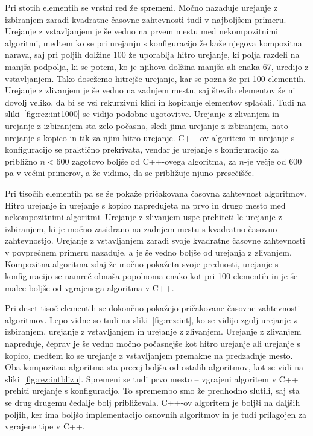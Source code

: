 \documentclass[a4paper,oneside,12pt]{article}
\begin{document}
Pri stotih elementih se vrstni red že spremeni. Močno nazaduje urejanje z izbiranjem zaradi 
kvadratne časovne zahtevnosti tudi v najboljšem primeru. Urejanje z vstavljanjem je še vedno 
na prvem mestu med nekompozitnimi algoritmi, medtem ko se pri urejanju s konfiguracijo že kaže njegova
kompozitna narava, saj pri poljih dolžine 100 že uporablja hitro urejanje, ki polja razdeli na 
manjša podpolja, ki se potem, ko je njihova dolžina manjša ali enaka 67, uredijo z vstavljanjem.
Tako dosežemo hitrejše urejanje, kar se pozna že pri 100 elementih. Urejanje z zlivanjem je še 
vedno na zadnjem mestu, saj število elementov še ni dovolj veliko, da bi se vsi rekurzivni klici 
in kopiranje elementov splačali. Tudi na sliki~\ref{fig:rez:int1000} se vidijo
podobne ugotovitve. Urejanje z zlivanjem in urejanje z izbiranjem sta zelo
počasna, 
sledi jima urejanje z izbiranjem, nato urejanje s kopico in tik za
njim hitro urejanje.  \mbox{C++-ov} algoritem in urejanje s konfiguracijo se praktično
prekrivata, vendar je urejanje s konfiguracijo za približno $n < 600$ zagotovo
boljše od \mbox{C++-ovega} algoritma, za $n$-je večje od 600 pa v večini primerov, a že
vidimo, da se približuje njuno presečišče.

Pri tisočih elementih pa se že pokaže pričakovana časovna zahtevnost algoritmov. Hitro urejanje in urejanje
s kopico napredujeta na prvo in drugo mesto med nekompozitnimi algoritmi. Urejanje z zlivanjem uspe 
prehiteti le urejanje z izbiranjem, ki je močno zasidrano na zadnjem mestu s kvadratno časovno 
zahtevnostjo. Urejanje z vstavljanjem zaradi svoje kvadratne časovne zahtevnosti v povprečnem 
primeru nazaduje, a je še vedno boljše od urejanja z zlivanjem.
Kompozitna algoritma zdaj že močno pokažeta svoje prednosti, urejanje s konfiguracijo se namreč 
obnaša popolnoma enako kot pri 100 elementih in je še malce boljše od vgrajenega
algoritma v C++.

Pri deset tisoč elementih se dokončno pokažejo pričakovane časovne zahtevnosti
algoritmov. Lepo vidne so tudi na sliki~\ref{fig:rez:int}, ko se vidijo zgolj
urejanje z izbiranjem, urejanje z vstavljanjem in urejanje z zlivanjem.
Urejanje z zlivanjem napreduje, čeprav je še vedno močno počasnejše kot hitro urejanje ali
urejanje s kopico, medtem ko se urejanje z vstavljanjem premakne na predzadnje 
mesto. Oba kompozitna algoritma sta precej boljša od ostalih algoritmov, kot se
vidi na sliki~\ref{fig:rez:intblizu}. Spremeni se tudi prvo mesto -- vgrajeni algoritem v C++
prehiti urejanje s konfiguracijo. To spremembo smo že predhodno slutili, saj sta
se drug drugemu čedalje bolj približevala. \mbox{C++-ov} algoritem je boljši na daljših
poljih, ker ima boljšo implementacijo osnovnih algoritmov in je tudi
prilagojen za vgrajene tipe v C++. 
\end{document}
